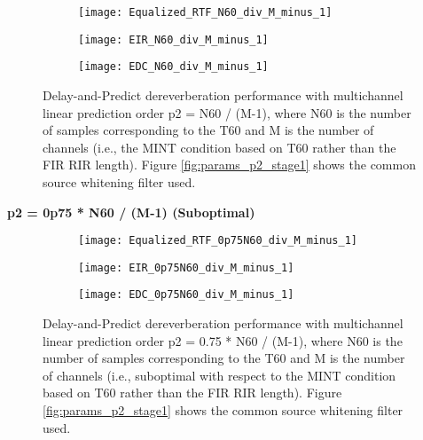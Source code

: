 \begin{figure}[H]
	\centering
	\begin{subfigure}[b]{0.32\textwidth}
		\centering
		\texttt{[image: Equalized\_RTF\_N60\_div\_M\_minus\_1]}
	\end{subfigure}
	\hfill
	\begin{subfigure}[b]{0.32\textwidth}
		\centering
		\texttt{[image: EIR\_N60\_div\_M\_minus\_1]}
	\end{subfigure}
	\hfill
	\begin{subfigure}[b]{0.32\textwidth}
		\centering
		\texttt{[image: EDC\_N60\_div\_M\_minus\_1]}
	\end{subfigure}
	\hfill
	\caption{Delay-and-Predict dereverberation performance with multichannel linear prediction order p2 = N60 / (M-1), where N60 is the number of samples corresponding to the T60 and M is the number of channels (i.e., the MINT condition based on T60 rather than the FIR RIR length). Figure \ref{fig:params_p2_stage1} shows the common source whitening filter used.}
	\label{fig:params_p2_N60}
\end{figure}

\textbf{p2 = 0p75 * N60 / (M-1) (Suboptimal)}

\begin{figure}[H]
	\centering
	\begin{subfigure}[b]{0.32\textwidth}
		\centering
		\texttt{[image: Equalized\_RTF\_0p75N60\_div\_M\_minus\_1]}
	\end{subfigure}
	\hfill
	\begin{subfigure}[b]{0.32\textwidth}
		\centering
		\texttt{[image: EIR\_0p75N60\_div\_M\_minus\_1]}
	\end{subfigure}
	\hfill
	\begin{subfigure}[b]{0.32\textwidth}
		\centering
		\texttt{[image: EDC\_0p75N60\_div\_M\_minus\_1]}
	\end{subfigure}
	\hfill
	\caption{Delay-and-Predict dereverberation performance with multichannel linear prediction order p2 = 0.75 * N60 / (M-1), where N60 is the number of samples corresponding to the T60 and M is the number of channels (i.e., suboptimal with respect to the MINT condition based on T60 rather than the FIR RIR length). Figure \ref{fig:params_p2_stage1} shows the common source whitening filter used.}
	\label{fig:params_p2_0p75_N60}
\end{figure}

